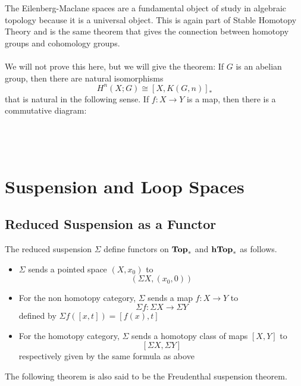 \documentclass[a4paper]{article}
\begin{document}
The Eilenberg-Maclane spaces are a fundamental object of study in algebraic topology because it is a universal object. This is again part of Stable Homotopy Theory and is the same theorem that gives the connection between homotopy groups and cohomology groups. \\~\\

We will not prove this here, but we will give the theorem: If $G$ is an abelian group, then there are natural isomorphisms $$H^n(X;G)\cong[X,K(G,n)]_\ast$$ that is natural in the following sense. If $f:X\to Y$ is a map, then there is a commutative diagram: \\~\\
\\~\\

\pagebreak
\section{Suspension and Loop Spaces}
\subsection{Reduced Suspension as a Functor}
\begin{thm}{}{} The reduced suspension $\Sigma$ define functors on $\bold{Top}_\ast$ and $\bold{hTop}_\ast$ as follows. 
\begin{itemize}
\item $\Sigma$ sends a pointed space $(X,x_0)$ to $$(\Sigma X,(x_0,0))$$
\item For the non homotopy category, $\Sigma$ sends a map $f:X\to Y$ to $$\Sigma f:\Sigma X\to\Sigma Y$$ defined by $\Sigma f([x,t])=[f(x),t]$
\item For the homotopy category, $\Sigma$ sends a homotopy class of maps $[X,Y]$ to $$[\Sigma X,\Sigma Y]$$ respectively given by the same formula as above
\end{itemize}
\end{thm}

The following theorem is also said to be the Freudenthal suspension theorem. 
\end{document}

